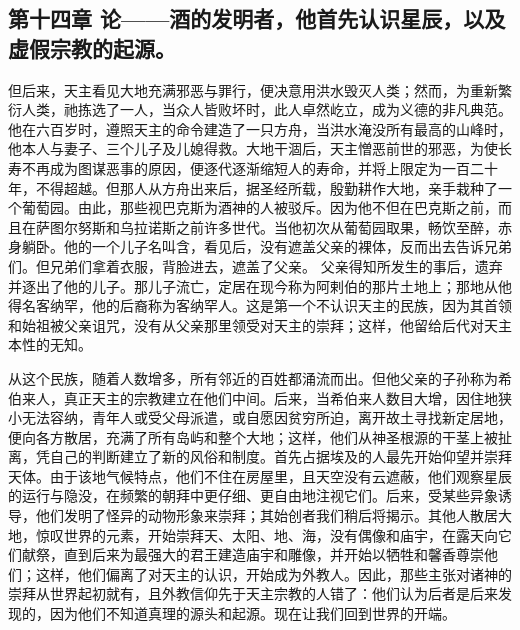 
\subsection{第十四章  论——酒的发明者，他首先认识星辰，以及虚假宗教的起源。}

但后来，天主看见大地充满邪恶与罪行，便决意用洪水毁灭人类；然而，为重新繁衍人类，祂拣选了一人，当众人皆败坏时，此人卓然屹立，成为义德的非凡典范。他在六百岁时，遵照天主的命令建造了一只方舟，当洪水淹没所有最高的山峰时，他本人与妻子、三个儿子及儿媳得救。大地干涸后，天主憎恶前世的邪恶，为使长寿不再成为图谋恶事的原因，便逐代逐渐缩短人的寿命，并将上限定为一百二十年，不得超越。但那人从方舟出来后，据圣经所载，殷勤耕作大地，亲手栽种了一个葡萄园。由此，那些视巴克斯为酒神的人被驳斥。因为他不但在巴克斯之前，而且在萨图尔努斯和乌拉诺斯之前许多世代。当他初次从葡萄园取果，畅饮至醉，赤身躺卧。他的一个儿子名叫含，看见后，没有遮盖父亲的裸体，反而出去告诉兄弟们。但兄弟们拿着衣服，背脸进去，遮盖了父亲。 父亲得知所发生的事后，遗弃并逐出了他的儿子。那儿子流亡，定居在现今称为阿剌伯的那片土地上；那地从他得名客纳罕，他的后裔称为客纳罕人。这是第一个不认识天主的民族，因为其首领和始祖被父亲诅咒，没有从父亲那里领受对天主的崇拜；这样，他留给后代对天主本性的无知。\par

从这个民族，随着人数增多，所有邻近的百姓都涌流而出。但他父亲的子孙称为希伯来人，真正天主的宗教建立在他们中间。后来，当希伯来人数目大增，因住地狭小无法容纳，青年人或受父母派遣，或自愿因贫穷所迫，离开故土寻找新定居地，便向各方散居，充满了所有岛屿和整个大地；这样，他们从神圣根源的干茎上被扯离，凭自己的判断建立了新的风俗和制度。首先占据埃及的人最先开始仰望并崇拜天体。由于该地气候特点，他们不住在房屋里，且天空没有云遮蔽，他们观察星辰的运行与隐没，在频繁的朝拜中更仔细、更自由地注视它们。后来，受某些异象诱导，他们发明了怪异的动物形象来崇拜；其始创者我们稍后将揭示。其他人散居大地，惊叹世界的元素，开始崇拜天、太阳、地、海，没有偶像和庙宇，在露天向它们献祭，直到后来为最强大的君王建造庙宇和雕像，并开始以牺牲和馨香尊崇他们；这样，他们偏离了对天主的认识，开始成为外教人。因此，那些主张对诸神的崇拜从世界起初就有，且外教信仰先于天主宗教的人错了：他们认为后者是后来发现的，因为他们不知道真理的源头和起源。现在让我们回到世界的开端。\par


